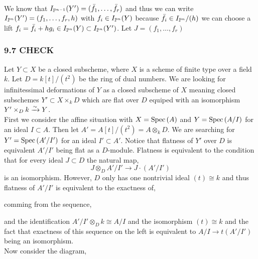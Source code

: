 \documentclass[12pt]{article}
\begin{document}
\bigskip\\
We know that $I_{\P^{n-1}}(Y') = (\bar{f}_1, \dots, \bar{f}_r)$ and thus we can write $I_{\P^n}(Y') = (f_1, \dots, f_r, h)$ with $f_i \in I_{\P^n}(Y)$ because $\bar{f}_i \in I_{\P^n}/(h)$ we can choose a lift $f_i = \bar{f}_i + h g_i \in I_{\P^n}(Y) \subset I_{\P^n}(Y')$. Let $J = (f_1, \dots, f_r)$

\subsubsection{9.7 CHECK}

Let $Y \subset X$ be a closed subscheme, where $X$ is a scheme of finite type over a field $k$. Let $D = k[t]/(t^2)$ be the ring of dual numbers. We are looking for infinitessimal deformations of $Y$ as a closed subscheme of $X$ meaning closed subschemes $Y' \subset X \times_k D$ which are flat over $D$ equiped with an isomorphism $Y' \times_D k \iso Y$. 
\bigskip\\
First we consider the affine situation with $X = \Spec{A}$ and $Y = \Spec{A/I}$ for an ideal $I \subset A$. Then let $A' = A[t]/(t^2) = A \otimes_k D$. We are searching for $Y' = \Spec{A'/I'}$ for an ideal $I' \subset A'$. Notice that flatness of $Y'$ over $D$ is equivalent $A'/I'$ being flat as a $D$-module. Flatness is equivalent to the condition that for every ideal $J \subset D$ the natural map,
\[ J \otimes_D A'/I' \to J \cdot (A'/I') \]
is an isomorphism. However, $D$ only has one nontrivial ideal $(t) \cong k$ and thus flatness of $A'/I'$ is equivalent to the exactness of,
\begin{center}
\end{center}
comming from the sequence,
\begin{center}
\end{center}
and the identification $A'/I' \otimes_D k \cong A/I$ and the isomorphism $(t) \cong k$ and the fact that exactness of this sequence on the left is equivalent to $A/I \to t (A'/I')$ being an isomorphism. 
\bigskip\\
Now consider the diagram,
\begin{center}
\end{center}
\end{document}
